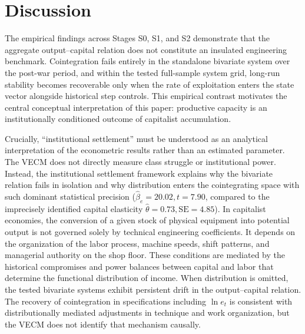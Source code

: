 \section{Discussion}
\label{sec:discussion}

The empirical findings across Stages S0, S1, and S2 demonstrate that the aggregate output--capital relation does not constitute an insulated engineering benchmark. Cointegration fails entirely in the standalone bivariate system over the post-war period, and within the tested full-sample system grid, long-run stability becomes recoverable only when the rate of exploitation enters the state vector alongside historical step controls. This empirical contrast motivates the central conceptual interpretation of this paper: productive capacity is an institutionally conditioned outcome of capitalist accumulation.

Crucially, ``institutional settlement'' must be understood as an analytical interpretation of the econometric results rather than an estimated parameter. The VECM does not directly measure class struggle or institutional power. Instead, the institutional settlement framework explains why the bivariate relation fails in isolation and why distribution enters the cointegrating space with such dominant statistical precision ($\hat{\beta}_e = 20.02, t = 7.90$, compared to the imprecisely identified capital elasticity $\hat{\theta} = 0.73, \text{SE} = 4.85$). In capitalist economies, the conversion of a given stock of physical equipment into potential output is not governed solely by technical engineering coefficients. It depends on the organization of the labor process, machine speeds, shift patterns, and managerial authority on the shop floor. These conditions are mediated by the historical compromises and power balances between capital and labor that determine the functional distribution of income. When distribution is omitted, the tested bivariate systems exhibit persistent drift in the output--capital relation. The recovery of cointegration in specifications including $\ln e_t$ is consistent with distributionally mediated adjustments in technique and work organization, but the VECM does not identify that mechanism causally.

